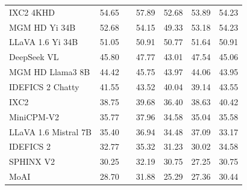 \begin{table}[h]
{\begin{tabular}{lalcccc@{}}
IXC2 4KHD \cite{dong2024internlmxcomposer24khd} & 54.65 &  & 57.89 & 52.68 & 53.89 & 54.23 \\
MGM HD Yi 34B \cite{li2024minigemini} & 52.68 &  & 54.15 & 49.33 & 53.18 & 54.23 \\
LLaVA 1.6 Yi 34B \cite{liu2024llavanext} & 51.05 &  & 50.91 & 50.77 & 51.64 & 50.91 \\
DeepSeek VL \cite{lu2024deepseekvl} & 45.80 &  & 47.77 & 43.01 & 47.54 & 45.06 \\
MGM HD Llama3 8B \cite{li2024minigemini} & 44.42 &  & 45.75 & 43.97 & 44.06 & 43.95 \\
IDEFICS 2 Chatty \cite{laurenccon2024matters} & 41.55 &  & 43.52 & 40.04 & 39.14 & 43.55 \\
IXC2 \cite{chen2023internvl} & 38.75 &  & 39.68 & 36.40 & 38.63 & 40.42 \\
MiniCPM-V2 \cite{viscpm} & 35.77 &  & 37.96 & 34.58 & 35.04 & 35.58 \\
LLaVA 1.6 Mistral 7B \cite{liu2024llavanext} & 35.40 &  & 36.94 & 34.48 & 37.09 & 33.17 \\
IDEFICS 2 \cite{laurenccon2024matters} & 32.77 &  & 35.32 & 31.23 & 30.02 & 34.58 \\
SPHINX V2 \cite{gao2024sphinxx} & 30.25 &  & 32.19 & 30.75 & 27.25 & 30.75 \\
MoAI \cite{lee2024moai} & 28.70 &  & 31.88 & 25.29 & 27.36 & 30.44 \\
    \bottomrule
    \hline
  \end{tabular}
  }
  \vspace{-2ex}
  \label{tab:val_desc_set_year}
\end{table}

